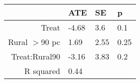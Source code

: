 \begin{tabular}{rlll}
  \hline
 & ATE & SE & p \\ 
  \hline
Treat & -4.68 & 3.6 & 0.1 \\ 
  Rural $>$90 pc & 1.69 & 2.55 & 0.25 \\ 
  Treat:Rural90 & -3.16 & 3.83 & 0.2 \\ 
  R squared & 0.44 &  &  \\ 
   \hline
\end{tabular}

